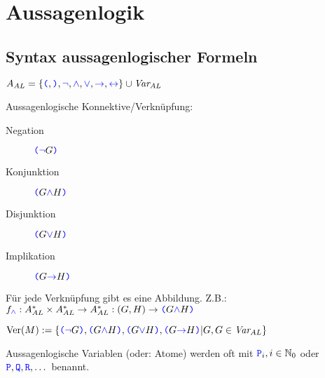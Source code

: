 \chapter{Aussagenlogik}

\section{Syntax aussagenlogischer Formeln}
\begin{definition}
  $A_{AL} = \{ \texttt{\color{blue}(}, \texttt{\color{blue})}, \mathtt{\color{blue}\neg}, \mathtt{\color{blue}\wedge}, \mathtt{\color{blue}\vee}, \mathtt{\color{blue}\to}, \mathtt{\color{blue}\leftrightarrow} \} \cup \textit{Var}_{AL}$
\end{definition}

\begin{definition}
  Aussagenlogische Konnektive/Verknüpfung:
  \begin{description}
  \item[Negation] $\texttt{\color{blue}(} \mathtt{\color{blue}\neg} G \texttt{\color{blue})}$
  \item[Konjunktion] $\texttt{\color{blue}(} G \mathtt{\color{blue}\wedge} H \texttt{\color{blue})}$
  \item[Disjunktion] $\texttt{\color{blue}(} G \mathtt{\color{blue}\vee} H \texttt{\color{blue})}$
  \item[Implikation] $\texttt{\color{blue}(} G \mathtt{\color{blue}\to} H \texttt{\color{blue})}$
  \end{description}
\end{definition}
\begin{remark}[Konstruktionsabbildungen]
  Für jede Verknüpfung gibt es eine Abbildung. Z.B.: $f_{\mathtt{\color{blue}\wedge}}: A_{AL}^{*} \times A_{AL}^{*} \to A_{AL}^{*}: (G, H) \to \texttt{\color{blue}(} G \mathtt{\color{blue}\wedge} H \texttt{\color{blue})}$
\end{remark}
\begin{remark}
  $\operatorname{Ver}(M) := \left\{ \texttt{\color{blue}(} \mathtt{\color{blue}\neg} G \texttt{\color{blue})}, \texttt{\color{blue}(} G \mathtt{\color{blue}\wedge} H \texttt{\color{blue})}, \texttt{\color{blue}(} G \mathtt{\color{blue}\vee} H \texttt{\color{blue})}, \texttt{\color{blue}(} G \mathtt{\color{blue}\to} H \texttt{\color{blue})} \middle| G, G \in \textit{Var}_{AL} \right\}$
\end{remark}

\begin{definition}
  Aussagenlogische Variablen (oder: Atome) werden oft mit $\texttt{\color{blue}P}_i, i \in \mathbb{N}_0$ oder $\texttt{\color{blue}P}, \texttt{\color{blue}Q}, \texttt{\color{blue}R}, \dots$ benannt.
\end{definition}

